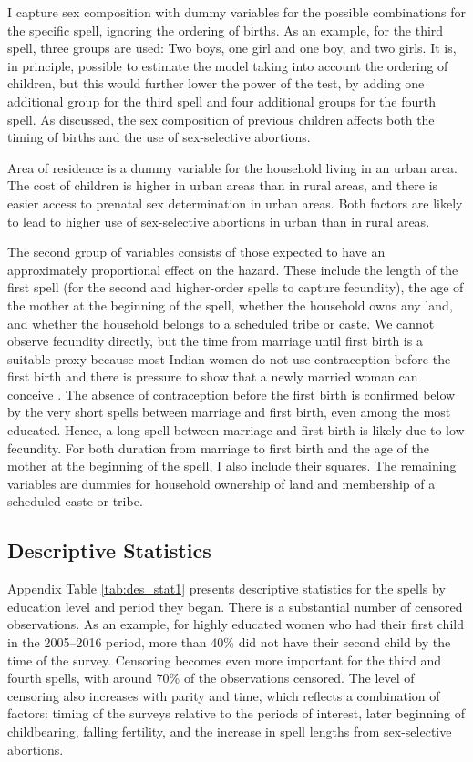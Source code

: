 \documentclass[12pt,letterpaper]{article}
\begin{document}
I capture sex composition with dummy variables for the
possible combinations for the specific spell, ignoring the ordering of births.
As an example, for the third spell, three groups are used: Two boys,
one girl and one boy, and two girls.
It is, in principle, possible to estimate the model taking into account
the ordering of children, but this would further lower the power of the
test, by adding one additional group for the third spell and four
additional groups for the fourth spell. 
As discussed, the sex composition of previous children affects both the timing
of births and the use of sex-selective abortions.

Area of residence is a dummy variable for the household living in
an urban area.
The cost of children is higher in urban areas than in rural areas, and 
there is easier access to prenatal sex determination in urban areas.
Both factors are likely to lead to higher use of sex-selective abortions
in urban than in rural areas.

The second group of variables consists of those expected to have an 
approximately proportional effect on the hazard.
These include the length of the first spell 
(for the second and higher-order spells to capture fecundity), 
the age of the mother at the beginning of the spell, 
whether the household owns any land, 
and whether the household belongs to a scheduled tribe or caste.
We cannot observe fecundity directly, but the time from marriage until 
first birth is a suitable proxy because most Indian women do not use 
contraception before the first birth and there is pressure to show that 
a newly married woman can conceive \citep{dyson83,Sethuraman2007,Dommaraju2009}.
The absence of contraception before the first birth is confirmed below by the 
very short spells between marriage and first birth, even among the most educated.
Hence, a long spell between marriage and first birth is likely due to low fecundity.
For both duration from marriage to first birth and the age of the mother at the 
beginning of the spell, I also include their squares.
The remaining variables are dummies for household ownership of land and membership
of a scheduled caste or tribe.


\subsection{Descriptive Statistics}

Appendix Table \ref{tab:des_stat1} presents descriptive statistics for
the spells by education level and period they began.
There is a substantial number of censored observations.
As an example, for highly educated women who had their first child in the 2005--2016
period, more than 40\% did not have their second child by the time of the survey.
Censoring becomes even more important for the third and fourth
spells, with around 70\% of the observations censored.
The level of censoring also increases with parity and time,
which reflects a combination of factors: timing of the surveys
relative to the periods of interest, later beginning of childbearing, 
falling fertility, and the increase in spell lengths from 
sex-selective abortions.
\end{document}

